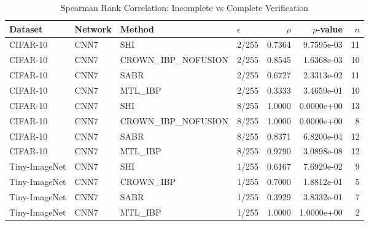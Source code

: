 \begin{table}[htbp]
\centering
\caption{Spearman Rank Correlation: Incomplete vs Complete Verification}
\label{tab:verification_correlation}
\begin{tabular}{llll|rrr}
\toprule
Dataset & Network & Method & $\epsilon$ & $\rho$ & $p$-value & $n$ \\
\midrule
CIFAR-10 & CNN7 & SHI & 2/255 & 0.7364 & 9.7595e-03 & 11 \\
CIFAR-10 & CNN7 & CROWN_IBP_NOFUSION & 2/255 & 0.8545 & 1.6368e-03 & 10 \\
CIFAR-10 & CNN7 & SABR & 2/255 & 0.6727 & 2.3313e-02 & 11 \\
CIFAR-10 & CNN7 & MTL_IBP & 2/255 & 0.3333 & 3.4659e-01 & 10 \\
CIFAR-10 & CNN7 & SHI & 8/255 & 1.0000 & 0.0000e+00 & 13 \\
CIFAR-10 & CNN7 & CROWN_IBP_NOFUSION & 8/255 & 1.0000 & 0.0000e+00 & 8 \\
CIFAR-10 & CNN7 & SABR & 8/255 & 0.8371 & 6.8200e-04 & 12 \\
CIFAR-10 & CNN7 & MTL_IBP & 8/255 & 0.9790 & 3.0898e-08 & 12 \\
Tiny-ImageNet & CNN7 & SHI & 1/255 & 0.6167 & 7.6929e-02 & 9 \\
Tiny-ImageNet & CNN7 & CROWN_IBP & 1/255 & 0.7000 & 1.8812e-01 & 5 \\
Tiny-ImageNet & CNN7 & SABR & 1/255 & 0.3929 & 3.8332e-01 & 7 \\
Tiny-ImageNet & CNN7 & MTL_IBP & 1/255 & 1.0000 & 1.0000e+00 & 2 \\
\bottomrule
\end{tabular}
\end{table}
